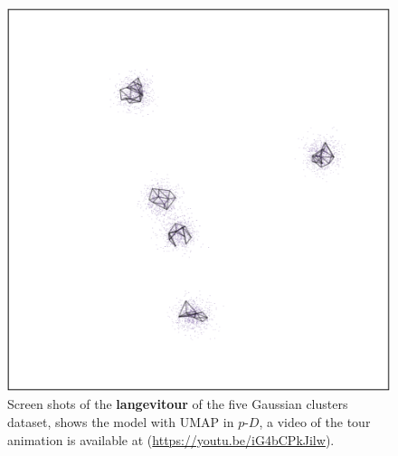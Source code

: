 \documentclass[
  12pt]{article}
\newcommand\pD{$p\text{-}D$}
\begin{document}
\begin{figure}[H]
%
\begin{minipage}{0.33\linewidth}
\includegraphics{figures/five_gau_clusters/sc_umap_3.png}\end{minipage}%

\caption{\label{fig-gau2_sc}Screen shots of the \textbf{langevitour} of
the five Gaussian clusters dataset, shows the model with UMAP in \pD{},
a video of the tour animation is available at
(\url{https://youtu.be/iG4bCPkJilw}).}

\end{figure}%
\end{document}
